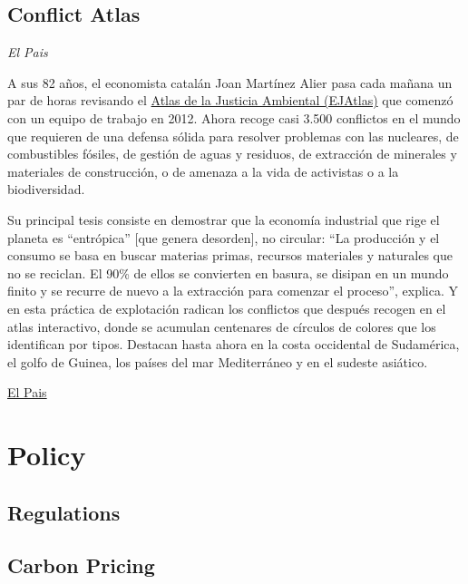 \documentclass[
]{book}
\begin{document}
\hypertarget{conflict-atlas}{%
\section{Conflict Atlas}\label{conflict-atlas}}

\emph{El Pais}

A sus 82 años, el economista catalán Joan Martínez Alier pasa cada mañana un par de horas revisando el \href{https://ejatlas.org/?translate=es}{Atlas de la Justicia Ambiental (EJAtlas)} que comenzó con un equipo de trabajo en 2012. Ahora recoge casi 3.500 conflictos en el mundo que requieren de una defensa sólida para resolver problemas con las nucleares, de combustibles fósiles, de gestión de aguas y residuos, de extracción de minerales y materiales de construcción, o de amenaza a la vida de activistas o a la biodiversidad.

Su principal tesis consiste en demostrar que la economía industrial que rige el planeta es ``entrópica'' {[}que genera desorden{]}, no circular: ``La producción y el consumo se basa en buscar materias primas, recursos materiales y naturales que no se reciclan. El 90\% de ellos se convierten en basura, se disipan en un mundo finito y se recurre de nuevo a la extracción para comenzar el proceso'', explica. Y en esta práctica de explotación radican los conflictos que después recogen en el atlas interactivo, donde se acumulan centenares de círculos de colores que los identifican por tipos. Destacan hasta ahora en la costa occidental de Sudamérica, el golfo de Guinea, los países del mar Mediterráneo y en el sudeste asiático.

\href{https://elpais.com/clima-y-medio-ambiente/2021-07-09/los-conflictos-ambientales-no-son-anecdoticos-son-sistemicos.html}{El Pais}

\hypertarget{policy}{%
\chapter{Policy}\label{policy}}

\hypertarget{regulations}{%
\section{Regulations}\label{regulations}}

\hypertarget{carbon-pricing}{%
\section{Carbon Pricing}\label{carbon-pricing}}
\end{document}
